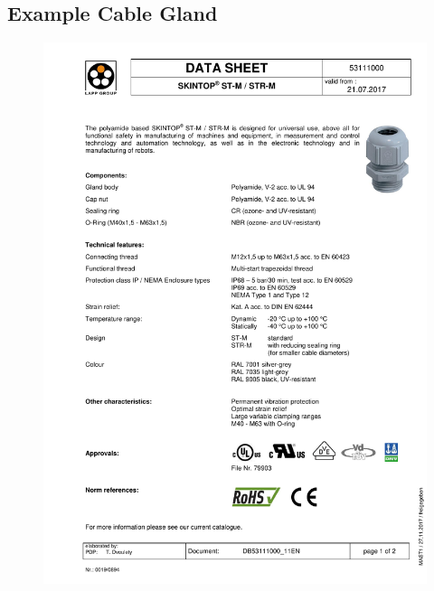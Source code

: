 \documentclass[../main.tex]{subfiles}
\begin{document}
\subsection{Example Cable Gland \cite{cableGland}} \label{CableGland}
\begin{figure}[H]
	\centering
	\includegraphics[page={1},width=\textwidth]{img/specs/gland.pdf}
\end{figure}
\end{document}
